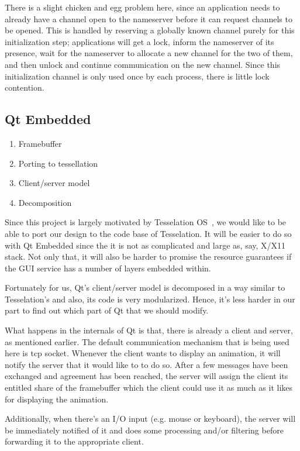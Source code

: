\documentclass[letterpaper,twocolumn,10pt]{article}
\begin{document}
There is a slight chicken and egg problem here, since an application needs to already have a channel open to the nameserver before it can request channels to be opened. This is handled by reserving a globally known channel purely for this initialization step; applications will get a lock, inform the nameserver of its presence, wait for the nameserver to allocate a new channel for the two of them, and then unlock and continue communication on the new channel. Since this initialization channel is only used once by each process, there is little lock contention.

\subsection{Qt Embedded}
\begin{enumerate}
\item Framebuffer
\item Porting to tessellation
\item Client/server model
\item Decomposition
\end{enumerate}

Since this project is largely motivated by Tesselation OS~\cite{liu09tessellation, tessellation-hotpar10}, we would like to be able to port our design to the code base of Tesselation. It will be easier to do so with Qt Embedded since the it is not as complicated and large as, say, X/X11 stack. Not only that, it will also be harder to promise the resource guarantees if the GUI service has a number of layers embedded within.

Fortunately for us, Qt's client/server model is decomposed in a way similar to Tesselation's and also, its code is very modularized. Hence, it's less harder in our part to find out which part of Qt that we should modify. 

What happens in the internals of Qt is that, there is already a client and server, as mentioned earlier. The default communication mechanism that is being used here is tcp socket. Whenever the client wants to display an animation, it will notify the server that it would like to to do so. After a few messages have been exchanged and agreement has been reached, the server will assign the client its entitled share of the framebuffer which the client could use it as much as it likes for displaying the animation.

Additionally, when there's an I/O input (e.g. mouse or keyboard), the server will be immediately notified of it and does some processing and/or filtering before forwarding it to the appropriate client. 
\end{document}
